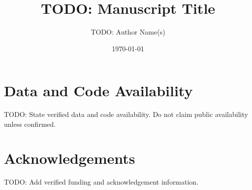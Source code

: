 \documentclass[11pt,a4paper]{article}
\title{TODO: Manuscript Title}
\author{TODO: Author Name(s)}
\date{\today}
\begin{document}
\maketitle








\section*{Data and Code Availability}
TODO: State verified data and code availability. Do not claim public availability unless confirmed.

\section*{Acknowledgements}
TODO: Add verified funding and acknowledgement information.

% 
% 
\end{document}
